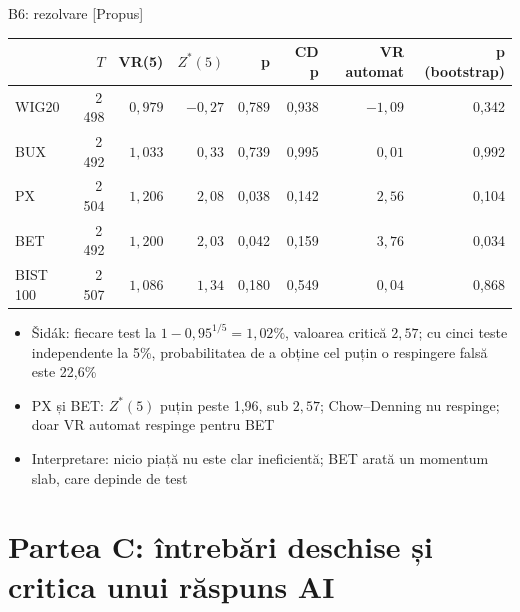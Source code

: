 \ifsolutions
\begin{frame}{B6: rezolvare [Propus]}
\itemsize{\footnotesize}
\begin{center}
\footnotesize
\begin{tabular}{lrrrrrrr}
\toprule
& $T$ & VR(5) & $Z^*(5)$ & p & CD p & VR automat & p (bootstrap) \\
\midrule
WIG20 & 2\,498 & $0{,}979$ & ${-0{,}27}$ & 0{,}789 & 0{,}938 & ${-1{,}09}$ & 0{,}342 \\
BUX & 2\,492 & $1{,}033$ & ${0{,}33}$ & 0{,}739 & 0{,}995 & ${0{,}01}$ & 0{,}992 \\
PX & 2\,504 & $1{,}206$ & ${2{,}08}$ & 0{,}038 & 0{,}142 & ${2{,}56}$ & 0{,}104 \\
BET & 2\,492 & $1{,}200$ & ${2{,}03}$ & 0{,}042 & 0{,}159 & ${3{,}76}$ & 0{,}034 \\
BIST 100 & 2\,507 & $1{,}086$ & ${1{,}34}$ & 0{,}180 & 0{,}549 & ${0{,}04}$ & 0{,}868 \\
\bottomrule
\end{tabular}
\end{center}
\begin{itemize}
    \item Šidák: fiecare test la $1 - 0{,}95^{1/5} = 1{,}02\%$, valoarea critică $2{,}57$; cu cinci teste independente la 5\%, probabilitatea de a obține cel puțin o respingere falsă este 22{,}6\%
    \item PX și BET: $Z^*(5)$ puțin peste 1,96, sub $2{,}57$; Chow--Denning nu respinge; doar VR automat respinge pentru BET
    \item Interpretare: nicio piață nu este clar ineficientă; BET arată un momentum slab, care depinde de test
\end{itemize}
\end{frame}
\fi


\section{Partea C: întrebări deschise și critica unui răspuns AI}

